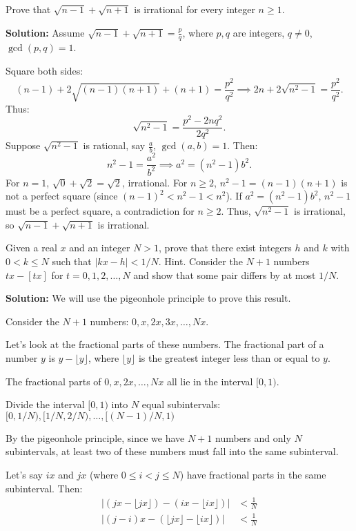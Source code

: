 \begin{problembox}
Prove that $\sqrt{n - 1} + \sqrt{n + 1}$ is irrational for every integer $n \geq 1$.
\end{problembox}

\textbf{Solution:}
Assume $\sqrt{n - 1} + \sqrt{n + 1} = \frac{p}{q}$, where $p, q$ are integers, $q \neq 0$, $\gcd(p, q) = 1$.

Square both sides:
\[
(n - 1) + 2\sqrt{(n - 1)(n + 1)} + (n + 1) = \frac{p^2}{q^2} \implies 2n + 2\sqrt{n^2 - 1} = \frac{p^2}{q^2}.
\]
Thus:
\[
\sqrt{n^2 - 1} = \frac{p^2 - 2n q^2}{2 q^2}.
\]
Suppose $\sqrt{n^2 - 1}$ is rational, say $\frac{a}{b}$, $\gcd(a, b) = 1$. Then:
\[
n^2 - 1 = \frac{a^2}{b^2} \implies a^2 = (n^2 - 1)b^2.
\]
For $n = 1$, $\sqrt{0} + \sqrt{2} = \sqrt{2}$, irrational. For $n \geq 2$, $n^2 - 1 = (n - 1)(n + 1)$ is not a perfect square (since $(n - 1)^2 < n^2 - 1 < n^2$). If $a^2 = (n^2 - 1)b^2$, $n^2 - 1$ must be a perfect square, a contradiction for $n \geq 2$. Thus, $\sqrt{n^2 - 1}$ is irrational, so $\sqrt{n - 1} + \sqrt{n + 1}$ is irrational.

\begin{problembox}
Given a real $x$ and an integer $N > 1$, prove that there exist integers $h$ and $k$ with $0 < k \leq N$ such that $|kx - h| < 1/N$. Hint. Consider the $N+1$ numbers $tx-[tx]$ for $t=0,1,2,\dots,N$ and show that some pair differs by at most $1/N$.
\end{problembox}

\textbf{Solution:}
We will use the pigeonhole principle to prove this result.

Consider the $N + 1$ numbers: $0, x, 2x, 3x, \ldots, Nx$.

Let's look at the fractional parts of these numbers. The fractional part of a number $y$ is $y - \lfloor y \rfloor$, where $\lfloor y \rfloor$ is the greatest integer less than or equal to $y$.

The fractional parts of $0, x, 2x, \ldots, Nx$ all lie in the interval $[0, 1)$.

Divide the interval $[0, 1)$ into $N$ equal subintervals:
$[0, 1/N), [1/N, 2/N), \ldots, [(N-1)/N, 1)$

By the pigeonhole principle, since we have $N + 1$ numbers and only $N$ subintervals, at least two of these numbers must fall into the same subinterval.

Let's say $ix$ and $jx$ (where $0 \leq i < j \leq N$) have fractional parts in the same subinterval. Then:
\begin{align*}
|(jx - \lfloor jx \rfloor) - (ix - \lfloor ix \rfloor)| &< \frac{1}{N} \\
|(j - i)x - (\lfloor jx \rfloor - \lfloor ix \rfloor)| &< \frac{1}{N}
\end{align*}


